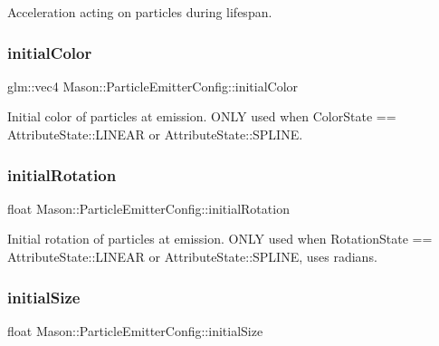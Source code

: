 Acceleration acting on particles during lifespan. 

\hypertarget{struct_mason_1_1_particle_emitter_config_a8580419bef5f1d337f75a5224dec0deb}{}\label{struct_mason_1_1_particle_emitter_config_a8580419bef5f1d337f75a5224dec0deb} 
\subsubsection{\texorpdfstring{initial\+Color}{initialColor}}
{\footnotesize\ttfamily glm\+::vec4 Mason\+::\+Particle\+Emitter\+Config\+::initial\+Color}



Initial color of particles at emission. O\+N\+LY used when Color\+State == Attribute\+State\+::\+L\+I\+N\+E\+AR or Attribute\+State\+::\+S\+P\+L\+I\+NE. 

\hypertarget{struct_mason_1_1_particle_emitter_config_a94e5a301870aa19cc1bf14d4613cc879}{}\label{struct_mason_1_1_particle_emitter_config_a94e5a301870aa19cc1bf14d4613cc879} 
\subsubsection{\texorpdfstring{initial\+Rotation}{initialRotation}}
{\footnotesize\ttfamily float Mason\+::\+Particle\+Emitter\+Config\+::initial\+Rotation}



Initial rotation of particles at emission. O\+N\+LY used when Rotation\+State == Attribute\+State\+::\+L\+I\+N\+E\+AR or Attribute\+State\+::\+S\+P\+L\+I\+NE, uses radians. 

\hypertarget{struct_mason_1_1_particle_emitter_config_a200875bdd8d24d919160527494c5b611}{}\label{struct_mason_1_1_particle_emitter_config_a200875bdd8d24d919160527494c5b611} 
\subsubsection{\texorpdfstring{initial\+Size}{initialSize}}
{\footnotesize\ttfamily float Mason\+::\+Particle\+Emitter\+Config\+::initial\+Size}



